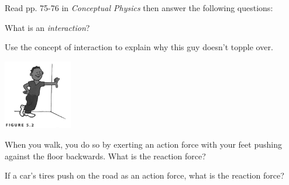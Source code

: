 \documentclass[10pt]{exam}
\begin{document}
\begin{questions}
{  Read pp. 75-76 in \emph{Conceptual Physics} then answer the following questions:
  
}
 
\question
  What is an \emph{interaction}?
  \vs

\question
  Use the concept of interaction to explain why this guy doesn't topple over.

  \includegraphics[width=3cm]{images/5-2.png}
  \vs
 
\question
  When you walk, you do so by exerting an action force with your feet pushing against the floor backwards.  What is the reaction force?
  \vs

\question
  If a car's tires push on the road as an action force, what is the reaction force?
  \vs


\end{questions}
\end{document}
